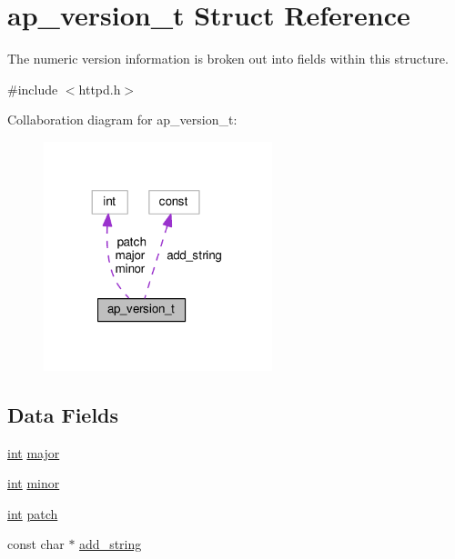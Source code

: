 \hypertarget{structap__version__t}{}\section{ap\+\_\+version\+\_\+t Struct Reference}
\label{structap__version__t}


The numeric version information is broken out into fields within this structure.  




{\ttfamily \#include $<$httpd.\+h$>$}



Collaboration diagram for ap\+\_\+version\+\_\+t\+:
\nopagebreak
\begin{figure}[H]
\begin{center}
\leavevmode
\includegraphics[width=188pt]{structap__version__t__coll__graph}
\end{center}
\end{figure}
\subsection*{Data Fields}
\begin{DoxyCompactItemize}
\item 
\hyperlink{pcre_8txt_a42dfa4ff673c82d8efe7144098fbc198}{int} \hyperlink{structap__version__t_a683c7fbfbe7d2acc4d1e98447e5dfcce}{major}
\item 
\hyperlink{pcre_8txt_a42dfa4ff673c82d8efe7144098fbc198}{int} \hyperlink{structap__version__t_a1fef6241aa800d1e2ab21a226d6ea63d}{minor}
\item 
\hyperlink{pcre_8txt_a42dfa4ff673c82d8efe7144098fbc198}{int} \hyperlink{structap__version__t_a1363a336b522aba0cce3ad63239343b3}{patch}
\item 
const char $\ast$ \hyperlink{structap__version__t_a8ad8a44c692da3a3e2486339316e067e}{add\+\_\+string}
\end{DoxyCompactItemize}


